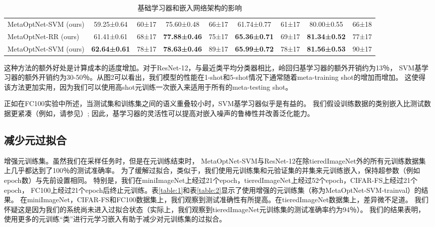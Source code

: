 \begin{table}[htbp]
{\begin{tabular}{lcccccccc}
    MetaOptNet-SVM (ours) & 59.25±0.64          & 60±17              & 75.60±0.48          & 66±17             & 61.74±0.77          & 61±17             & 80.00±0.55          & 66±18             \\
    MetaOptNet-RR (ours)  & 61.41±0.61          & 68±17              & \textbf{77.88±0.46} & 75±17             & \textbf{65.36±0.71} & 69±17             & \textbf{81.34±0.52} & 77±17             \\
    MetaOptNet-SVM (ours) & \textbf{62.64±0.61} & 78±17              & \textbf{78.63±0.46} & 89±17             & \textbf{65.99±0.72} & 78±17             & \textbf{81.56±0.53} & 90±17             \\ \hline
    \end{tabular}
    }
    \caption{基础学习器和嵌入网络架构的影响}
    \label{table:3}
    \end{table}

这种方法的额外好处是计算成本的适度增加。对于ResNet-12，与最近类平均分类器相比，岭回归基学习器的额外开销约为13％，
SVM基学习器的额外开销约为30-50％。从图2可以看出，我们模型的性能在1-shot和5-shot情况下通常随着meta-training shot的增加而增加。
这使得该方法更加实用，因为我们可以使用高shot元训练一次嵌入来适用于所有的meta-testing shot。

正如在FC100实验中所述，当测试集和训练集之间的语义重叠较小时，SVM基学习器似乎是有益的。
我们假设训练数据的类别嵌入比测试数据更紧凑（例如，请参见\cite{yosinski2014transferable}）; 因此，基学习器的灵活性可以提高对嵌入噪声的鲁棒性并改善泛化能力。

\subsection{减少元过拟合}

增强元训练集。虽然我们在采样任务时，但是在元训练结束时，
MetaOptNet-SVM与ResNet-12在除tieredImageNet外的所有元训练数据集上几乎都达到了100％的测试准确率。
为了缓解过拟合，类似于\cite{rusu2018meta,qiao2018few}，我们使用元训练集和元验证集的并集来元训练嵌入，保持超参数（例如epoch数）与先前设置相同。
特别是，我们在miniImageNet上经过21个epoch，tieredImageNet上经过52个epoch，CIFAR-FS上经过21个epoch，
FC100上经过21个epoch后终止元训练。表\ref{table:1}和表\ref{table:2}显示了使用增强的元训练集（称为MetaOptNet-SVM-trainval）的结果。
在miniImageNet，CIFAR-FS和FC100数据集上，我们观察到测试准确性有所提高。在tieredImageNet数据集上，差异微不足道。
我们怀疑这是因为我们的系统尚未进入过拟合状态（实际上，我们观察到tieredImageNet元训练集的测试准确率约为94％）。
我们的结果表明，使用更多的元训练“类”进行元学习嵌入有助于减少对元训练集的过拟合。

